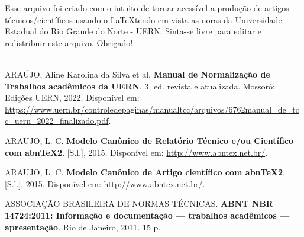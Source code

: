 \documentclass[
article,			%
12pt,				%
oneside,			%
a4paper,			%
english,			%
brazil,				%
sumario=tradicional
]{abntex2}
\begin{document}
    Esse arquivo foi criado com o intuito de tornar acessível a produção de artigos técnicos/científicos usando o \LaTeX tendo em vista as noras da Universidade Estadual do Rio Grande do Norte - UERN. Sinta-se livre para editar e redistribuir este arquivo. Obrigado! \\\\

    


\renewcommand{\bibname}{\normalsize \bfseries \sffamily REFERÊNCIAS}
\begin{thebibliography}{80}
    ARAÚJO, Aline Karolina da Silva et al. \textbf{Manual de Normalização de Trabalhos acadêmicos da UERN}. 3. ed. revista e atualizada. Mossoró: Edições UERN, 2022. Disponível em: \url{https://www.uern.br/controledepaginas/manualtcc/arquivos/6762manual_de_tcc_uern_2022_finalizado.pdf}.

    ARAUJO, L. C. \textbf{Modelo Canônico de Relatório Técnico e/ou Científico com
abnTeX2}. [S.l.],
2015. Disponível em: \url{http://www.abntex.net.br/}.

 ARAUJO, L. C. \textbf{Modelo Canônico de Artigo científico com abnTeX2}. [S.l.], 2015.
Disponível em: \url{http://www.abntex.net.br/}.

 ASSOCIAÇÃO BRASILEIRA DE NORMAS TÉCNICAS. \textbf{ABNT NBR
14724:2011: Informação e documentação — trabalhos acadêmicos — apresentação}.
Rio de Janeiro, 2011. 15 p.
\end{thebibliography}
\end{document}

